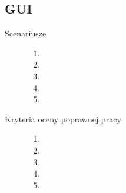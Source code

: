 \documentclass[a4paper,11pt]{article}
\begin{document}
\subsection{GUI}
\begin{description}

\item[Scenariusze] \hfill
\begin{enumerate}
\item
\item 
\item
\item
\item 
\end{enumerate}

\item[Kryteria oceny poprawnej pracy] \hfill
\begin{enumerate}
\item 
\item
\item
\item 
\item 
\end{enumerate}

\end{description}
\end{document}
